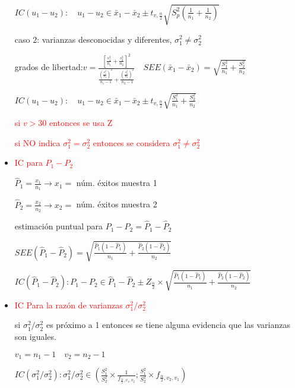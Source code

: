 \documentclass{article}
\begin{document}
\begin{itemize}
    $IC(u_1-u_2):\quad u_1-u_2\in\bar{x}_1-\bar{x}_2\pm t_{v,\frac{\alpha}{2}}\sqrt{S^2_p\left(\frac{1}{n_1}+\frac{1}{n_2}\right)}$
    
    caso 2: varianzas desconocidas y diferentes, 
    $\sigma^2_1\neq\sigma^2_2$

    grados de libertad:$v=\frac{\left [\frac{s^2_1}{n_1}+\frac{s^2_2}{n_2}\right]^2}{\frac{\left(\frac{s^2_1}{n_1}\right)^2}{n_1-1}+\frac{\left(\frac{s^2_2}{n_2}\right)^2}{n_2-1}}\quad SEE(\bar{x}_1-\bar{x}_2)=\sqrt{\frac{S^2_1}{n_1}+\frac{S^2_2}{n_2}}$

    $IC(u_1-u_2):\quad u_1-u_2\in\bar{x}_1-\bar{x}_2\pm t_{v,\frac{\alpha}{2}}\sqrt{\frac{S^2_1}{n_1}+\frac{S^2_2}{n_2}}$

    \textcolor{red}{si $v>30$ entonces se usa Z}

    \textcolor{red}{si NO indica $\sigma^2_1=\sigma^2_2$ entonces se considera $\sigma^2_1\neq\sigma^2_2$ 
    }
    \newpage
    \item \textcolor{red}{IC para $P_1-P_2$}

    $\widehat{P}_1=\frac{x_1}{n_1}\rightarrow x_1=$ núm. éxitos muestra 1

    $\widehat{P}_2=\frac{x_2}{n_2}\rightarrow x_2=$ núm. éxitos muestra 2

    estimación puntual para $P_1-P_2=\widehat{P}_1-\widehat{P}_2$

    $SEE(\widehat{P}_1-\widehat{P}_2)=\sqrt{\frac{\widehat{P}_1(1-\widehat{P}_1)}{n_1}+\frac{\widehat{P}_2(1-\widehat{P}_2)}{n_2}}$
    
    $ IC(\widehat{P}_1-\widehat{P}_2): P_1-P_2\in \widehat{P}_1-\widehat{P}_2\pm Z_{\frac{\alpha}{2}}\times\sqrt{\frac{\widehat{P}_1(1-\widehat{P}_1)}{n_1}+\frac{\widehat{P}_2(1-\widehat{P}_2)}{n_2}}$

    \item \textcolor{red}{IC Para la razón de varianzas $\sigma^2_1/\sigma^2_2$}

    si $\sigma^2_1/\sigma^2_2$ es próximo a 1 entonces se tiene alguna evidencia que las varianzas son iguales.

    $v_1=n_1-1\quad v_2=n_2-1$

    $IC(\sigma^2_1/\sigma^2_2): \sigma^2_1/\sigma^2_2\in\left(\frac{S^2_1}{S^2_2}\times\frac{1}{f_{\frac{\alpha}{2},v_1,v_2}};\frac{S^2_1}{S^2_2}\times f_{\frac{\alpha}{2},v_2,v_1}\right)$
    
\end{itemize}
\end{document}
